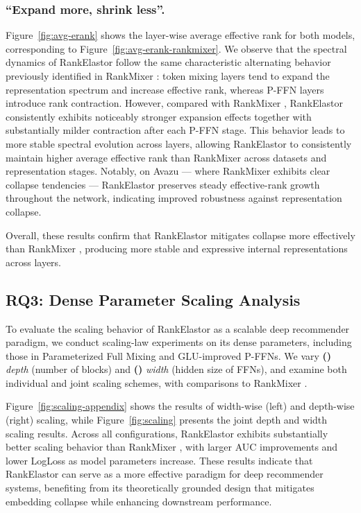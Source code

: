 \documentclass[sigconf,screen]{acmart}
\newcommand{\unimixer}{RankElastor }
\newcommand{\rankmixer}{RankMixer }
\begin{document}
\subsubsection*{\bf ``Expand more, shrink less''.} Figure~\ref{fig:avg-erank} shows the layer-wise average effective rank for both models, corresponding to Figure~\ref{fig:avg-erank-rankmixer}. 
We observe that the spectral dynamics of \unimixer follow the same characteristic alternating behavior previously identified in \rankmixer: token mixing layers tend to expand the representation spectrum and increase effective rank, whereas P-FFN layers introduce rank contraction. 
However, compared with \rankmixer, \unimixer consistently exhibits noticeably stronger expansion effects together with substantially milder contraction after each P-FFN stage. 
This behavior leads to more stable spectral evolution across layers, allowing \unimixer to consistently maintain higher average effective rank than \rankmixer across datasets and representation stages. 
Notably, on Avazu — where \rankmixer exhibits clear collapse tendencies — \unimixer preserves steady effective-rank growth throughout the network, indicating improved robustness against representation collapse.

Overall, these results confirm that \unimixer mitigates collapse more effectively than \rankmixer, producing more stable and expressive internal representations across layers.



\subsection{RQ3: Dense Parameter Scaling Analysis}
\label{sec:exps:exps_scaling}
To evaluate the scaling behavior of \unimixer as a scalable deep recommender paradigm, we conduct scaling-law experiments on its dense parameters, including those in Parameterized Full Mixing and GLU-improved P-FFNs. 
We vary \textbf{()} \textit{depth} (number of blocks) and \textbf{()} \textit{width} (hidden size of FFNs), and examine both individual and joint scaling schemes, with comparisons to \rankmixer.

Figure~\ref{fig:scaling-appendix} shows the results of width-wise (left) and depth-wise (right) scaling, while Figure~\ref{fig:scaling} presents the joint depth and width scaling results. 
Across all configurations, \unimixer exhibits substantially better scaling behavior than \rankmixer, with larger AUC improvements and lower LogLoss as model parameters increase. 
These results indicate that \unimixer can serve as a more effective paradigm for deep recommender systems, benefiting from its theoretically grounded design that mitigates embedding collapse while enhancing downstream performance.
\end{document}
